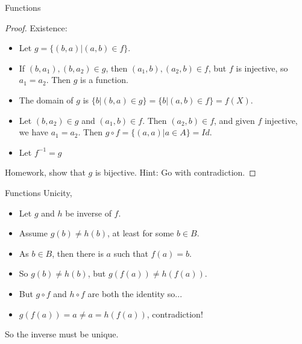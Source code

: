 \documentclass[aspectratio=169, handout]{beamer}
\begin{document}
\begin{frame}{Functions}
    
    \begin{proof}
    
    Existence:
    
        \begin{itemize}
        
        \item Let $g = \{(b,a)|(a,b)\in f\}$. \pause
        
        \item If $(b,a_1),(b,a_2)\in g$, then $(a_1,b),(a_2,b)\in f$, but $f$ is injective, so $a_1 = a_2$. Then $g$ is a function.\pause
        
        \item The domain of $g$ is $\{b|(b,a)\in g\} = \{b|(a,b)\in f\} = f(X)$.\pause
        
        \item Let $(b,a_2)\in g$ and $(a_1,b)\in f$. Then $(a_2,b)\in f$, and given $f$ injective, we have $a_1=a_2$. Then $g\circ f = \{(a,a)|a\in A\} = Id.$\pause
        
        \item Let $f^{-1} = g$
        
        \end{itemize}
        
        Homework, show that $g$ is bijective. Hint: Go with contradiction.
    \end{proof}
    
\end{frame}

\begin{frame}{Functions}
    Unicity,
    
    \begin{itemize}
        \item Let $g$ and $h$ be inverse of $f$.\pause
        
        \item Assume $g(b)\neq h(b)$, at least for some $b\in B$.\pause
        
        \item As $b\in B$, then there is $a$ such that $f(a)=b$.\pause
        
        \item So $g(b) \neq h(b)$, but $g(f(a)) \neq h(f(a))$.\pause
        
        \item But $g\circ f$ and $h\circ f$ are both the identity so...\pause
        
        \item $g(f(a)) = a \neq a = h(f(a))$, contradiction!
        
    \end{itemize}
    
    So the inverse must be unique.
    
\end{frame}
\end{document}

